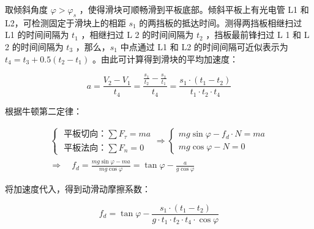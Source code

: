 取倾斜角度 $\varphi>\varphi_s$ ，使得滑块可顺畅滑到平板底部。倾斜平板上有光电管 L1 和 L2，可检测固定于滑块上的相距 $s_1$ 的两挡板的抵达时间。测得两挡板相继扫过 L1 的时间间隔为 $t_1$ ，相继扫过 L 2 的时间间隔为 $t_2$ ，挡板最前锋扫过 L 1 和 L 2 的时间间隔为 $t_3$ ，那么，$s_1$ 中点通过 L1 和 L2 的时间间隔可近似表示为 $t_4=t_3+0.5\left(t_2-t_1\right)$ 。由此可计算得到滑块的平均加速度：

$$
a=\frac{V_2-V_1}{t_4}=\frac{\frac{s_1}{t_2}-\frac{s_1}{t_1}}{t_4}=\frac{s_1 \cdot\left(t_1-t_2\right)}{t_1 \cdot t_2 \cdot t_4}
$$


根据牛顿第二定律：

$$
\begin{gathered}
\left\{\begin{array} { l } 
{ \text { 平板切向：} \sum F _ { \tau } = m a } \\
{ \text { 平板法向：} \sum F _ { n } = 0 }
\end{array} \Rightarrow \left\{\begin{array}{l}
m g \sin \varphi-f_d \cdot N=m a \\
m g \cos \varphi-N=0
\end{array}\right.\right. \\
\Rightarrow \quad f_d=\frac{m g \sin \varphi-m a}{m g \cos \varphi}=\tan \varphi-\frac{a}{g \cos \varphi}
\end{gathered}
$$


将加速度代入，得到动滑动摩擦系数：

$$
f_d=\tan \varphi-\frac{s_1 \cdot\left(t_1-t_2\right)}{g \cdot t_1 \cdot t_2 \cdot t_4 \cdot \cos \varphi}
$$


   